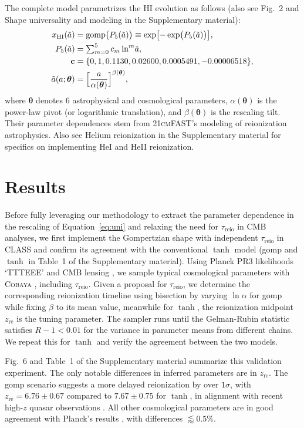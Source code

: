 \documentclass[12pt]{article}
\newcommand{\vtheta}{\boldsymbol{\theta}}
\newcommand{\HI}{\mathrm{HI}}
\newcommand{\re}{\mathrm{re}}
\newcommand{\reio}{\mathrm{reio}}
\newcommand{\ap}{\alpha}
\newcommand{\tilt}{\beta}
\newcommand{\ar}{\tilde{a}}
\newcommand{\gomp}{\mathrm{gomp}}
\begin{document}
The complete model parametrizes the HI evolution as follows (also see
Fig.~2 and Shape universality and modeling in the
Supplementary material):
%
\begin{align}
\label{eq:uni}
x_\HI(\ar) &= \gomp\bigl( P_5(\ar) \bigr)
  \equiv \exp\bigl[ - \exp\bigl( P_5(\ar) \bigr) \bigr], \\
%
\label{eq:poly}
P_5(\ar) &= {\textstyle\sum}_{m=0}^5 \, c_m \ln^m\!\ar, \\
%
\mathbf{c} &= \{0, 1, 0.1130, 0.02600, 0.0005491, -0.00006518\}, \nonumber\\
%
\label{eq:map}
\ar(a; \vtheta) &= \Bigl[ \frac{a}{\ap(\vtheta)} \Bigr]^{\tilt(\vtheta)},
\end{align}
%
where $\vtheta$ denotes 6 astrophysical and cosmological parameters,
$\ap(\vtheta)$ is the power-law pivot (or logarithmic translation), and
$\tilt(\vtheta)$ is the rescaling tilt.
Their parameter dependences stem from \textsc{21cmFAST}'s modeling of
reionization astrophysics.
Also see Helium reionization in the Supplementary material for specifics on implementing HeI and
HeII reionization.


\section{Results}
Before fully leveraging our methodology to extract the parameter
dependence in the rescaling of Equation~\eqref{eq:uni} and relaxing the need for
$\tau_\reio$ in CMB analyses, we first implement the Gompertzian shape with
independent $\tau_\reio$ in \textsc{CLASS} and confirm its agreement
with the conventional $\tanh$ model (gomp and $\tanh$ in
Table~1 of the Supplementary material).
Using Planck PR3 likelihoods `TTTEEE' \cite{Planck2020c} and CMB lensing
\cite{Planck2020d}, we sample typical cosmological parameters with
\textsc{Cobaya} \cite{Torrado2020}, including $\tau_\reio$.
Given a proposal for $\tau_\reio$, we determine the corresponding
reionization timeline using bisection by varying $\ln\ap$ for gomp
while fixing $\tilt$ to its mean value,
meanwhile for $\tanh$, the reionization midpoint $z_\re$ is the tuning
parameter.
The sampler runs until the Gelman-Rubin statistic \cite{Gelman1992}
satisfies $R - 1 < 0.01$ for the variance in parameter means from
different chains.
We repeat this for $\tanh$ and verify the agreement between the two
models.

Fig.~6 and Table~1 of the Supplementary material summarize this
validation experiment.
The only notable differences in inferred parameters are in $z_\re$.
The gomp scenario suggests a more delayed reionization by over
$1\sigma$, with $z_\re = 6.76 \pm 0.67$ compared to $7.67 \pm 0.75$ for
$\tanh$, in alignment with recent high-$z$ quasar observations
\cite{Keating2020}.
All other cosmological parameters are in good agreement with Planck's
results \cite{Planck2020a}, with differences $\lessapprox 0.5 \%$.
\end{document}
